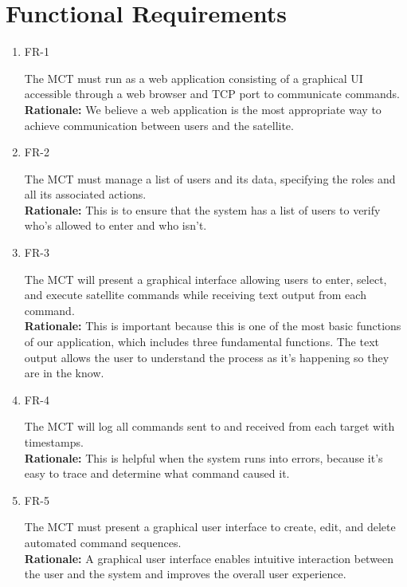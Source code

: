\documentclass[12pt]{article}
\begin{document}
\section{Functional Requirements}
\begin{enumerate}
    \item{FR-1\\}
    
    The MCT must run as a web application consisting of a graphical UI accessible through a web browser and TCP port to communicate commands. \\
    \textbf{Rationale:} We believe a web application is the most appropriate way to achieve communication between users and the satellite. 
    
    \item{FR-2\\}
    
    The MCT must manage a list of users and its data, specifying the roles and all its associated actions. \\
    \textbf{Rationale:} This is to ensure that the system has a list of users to verify who’s allowed to enter and who isn’t. 

    \item{FR-3\\}
    

    The MCT will present a graphical interface allowing users to enter, select, and execute satellite commands while receiving text output from each command. \\
    \textbf{Rationale:} This is important because this is one of the most basic functions of our application, which includes three fundamental functions. The text output allows the user to understand the process as it’s happening so they are in the know. 

    \item{FR-4\\}
    
    The MCT will log all commands sent to and received from each target with timestamps. \\
    \textbf{Rationale:} This is helpful when the system runs into errors, because it’s easy to trace and determine what command caused it. 

    \item{FR-5\\}
    
    The MCT must present a graphical user interface to create, edit, and delete automated command sequences. \\
    \textbf{Rationale:} A graphical user interface enables intuitive interaction between the user and the system and improves the overall user experience. 


\end{enumerate}
\end{document}

